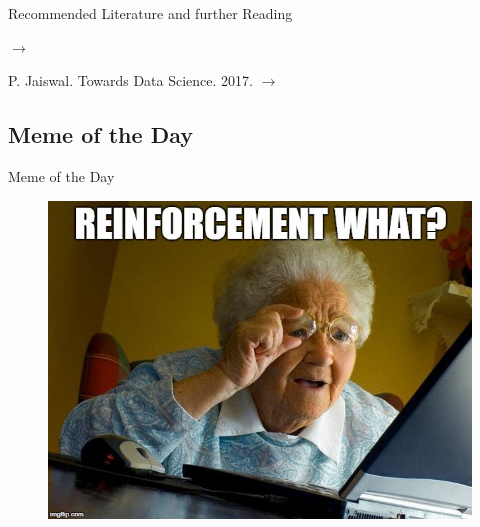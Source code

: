 \begin{frame}[allowframebreaks]{Recommended Literature and further Reading}{}
\begin{thebibliography}{2}
			{$\rightarrow$
				\href{https://gym.openai.com/}{}
			}
			
			{P. Jaiswal. Towards Data Science. 2017.}
			{$\rightarrow$
				\href{https://towardsdatascience.com/getting-started-with-reinforcement-q-learning-77499b1766b6}
				{}
			}
	\end{thebibliography}
\end{frame}


\subsection{Meme of the Day}

\begin{frame}{Meme of the Day}{}
	\begin{figure}
		\includegraphics[scale=0.30]{14_rl/02_img/meme_of_the_day}
	\end{figure}
\end{frame}


\makethanks

